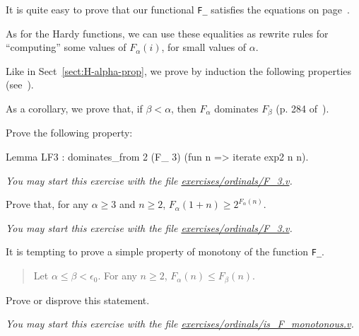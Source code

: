 



It is quite easy to prove that our functional \texttt{F\_} satisfies the equations on page~\pageref{sect:F-equations}.




As for the Hardy functions, we can use these equalities as rewrite rules for
``computing'' some values of $F_\alpha(i)$, for small values of $\alpha$.



Like in Sect~\ref{sect:H-alpha-prop}, we prove by induction the following properties (see~\cite{KS81}). 




As a corollary, we prove that, if $\beta<\alpha$, then
$F_\alpha$ dominates $F_\beta$ (p. 284 of~\cite{KS81}).






\begin{exercise}
Prove the following property:

\begin{Coqsrc}
Lemma LF3 : dominates_from  2 (F_ 3) (fun  n => iterate exp2 n n).
\end{Coqsrc}

\emph{You may start this exercise with the file
\href{https://github.com/coq-community/hydra-battles/tree/master/exercises/ordinals/F_3.v}{exercises/ordinals/F\_3.v}.}
\end{exercise}


\begin{exercise}
Prove that, for any $\alpha\geq 3$ and $n\geq 2$,
$F_\alpha(1+n)\geq 2^{F_\alpha(n)}$.



\emph{You may start this exercise with the file
    \href{https://github.com/coq-community/hydra-battles/tree/master/exercises/ordinals/F_3.v}{exercises/ordinals/F\_3.v}.}
\end{exercise}



\begin{exercise}
It is tempting to prove a simple property of monotony 
of the function \texttt{F\_}.

\begin{quote}
   Let $\alpha\leq\beta<\epsilon_0$. For any $n\geq 2$,
$F_\alpha(n)\leq F_\beta(n)$. 
\end{quote}
Prove or disprove this statement.

\emph{You may start this exercise with the file
    \href{https://github.com/coq-community/hydra-battles/tree/master/exercises/ordinals/is_F_monotonous.v}{exercises/ordinals/is\_F\_monotonous.v}.}
\end{exercise}

